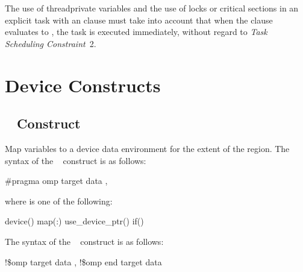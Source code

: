 The use of threadprivate variables and the use of locks or critical sections in an explicit 
task with an  clause must take into account that when the  clause evaluates to 
, the task is executed immediately, without regard to \emph{Task Scheduling Constraint}~2.
\noteend








\section{Device Constructs}
\label{sec:Device Constructs}

\subsection{~ Construct}
\label{subsec:target data Construct}
\summary
 Map variables to a device data environment for the extent of the region.
\syntax
\ccppspecificstart
The syntax of the ~ construct is as follows:

\begin{boxedcode}
\#pragma omp target data \plc{[clause[ [},\plc{] clause] } \plc{... ] new-line}
\end{boxedcode}

\begin{samepage}
where  is one of the following:

\begin{indentedcodelist}
device()
map(\plc{[[map-type-modifier[,]] map-type}:\plc{ ] list})
use\_device\_ptr()
if()
\end{indentedcodelist}
\ccppspecificend
\medskip
\end{samepage}

\fortranspecificstart
The syntax of the ~ construct is as follows:

\begin{boxedcode}
!\$omp target data \plc{[clause[ [},\plc{] clause] ... ]}
!\$omp end target data
\end{boxedcode}


